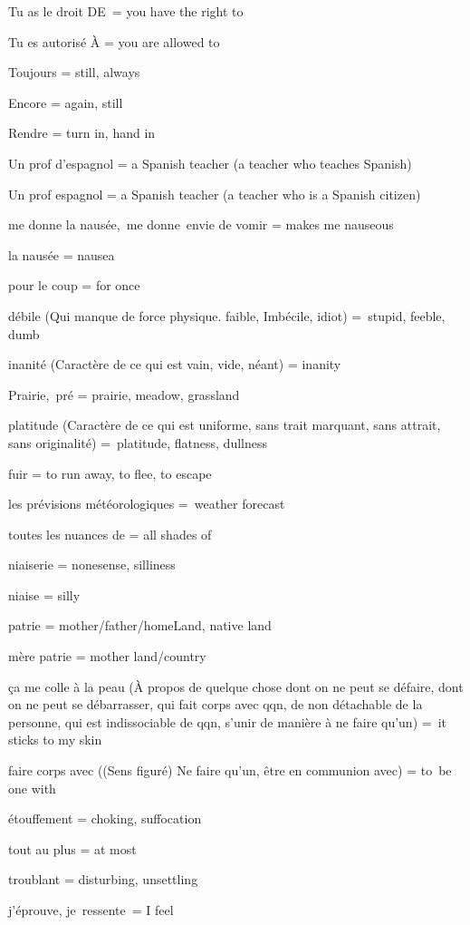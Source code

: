 {Tu as le droit DE~= you have the right to}

{Tu es autorisé À = you are allowed to}

{Toujours = still, always~}

{Encore = again, still}

{Rendre = turn in, hand in}

{Un prof d'espagnol = a Spanish teacher (a teacher who teaches Spanish)}

{Un prof espagnol = a Spanish teacher (a teacher who is a Spanish
citizen)}

{me donne la nausée,~}{me donne~}{envie de vomir} {= makes me nauseous}

{la nausée = nausea}

{pour le coup = for once}

{débile (Qui manque de force physique. faible, Imbécile, idiot)
=~}{stupid, feeble, dumb}

{inanité (Caractère de ce qui est vain, vide, néant) = inanity}

{Prairie,~}{pré} {= prairie, meadow, grassland}

{platitude (Carac}{tère de ce qui est uniforme, sans trait marquant,
sans attrait,} {sans originalité}{) =~}{platitude, flatness, dullness}

{fuir = to run away, to flee, to escape}

{les prévisions météorologiques =~}{weather forecast}

{toutes les nuances de = all shades of}

{niaiserie = nonesense, silliness}

{niaise = silly}

{patrie = mother/father/homeLand, native land}

{mère patrie = mother land/country}

{ça me colle à la peau (À propos de quelque chose dont on ne peut se
défaire, dont on ne peut se débarrasser, qui fait corps avec qqn, de non
détachable de la personne, qui est indissociable de qqn,} {s'unir de
manière à ne faire qu'un}{) =~}{it sticks to my skin}

{faire corps avec (}(Sens figuré) Ne faire qu'un, être en communion
avec{) = to~}{be one with}

{étouffement = choking, suffocation}

{tout au plus = at most}

{troublant = disturbing, unsettling}

{j'éprouve, je~}{ressente}{~= I feel}

